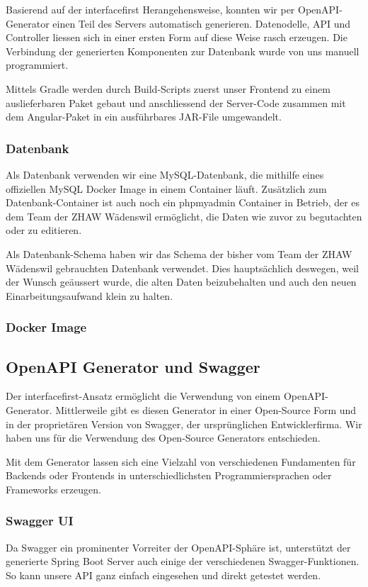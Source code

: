 \documentclass[../main.tex]{subfiles}
\begin{document}
	\noindent Basierend auf der \gls{interfacefirst} Herangehensweise, konnten wir per OpenAPI-Generator einen Teil des Servers automatisch generieren. Datenodelle, API und Controller liessen sich in einer ersten Form auf diese Weise rasch erzeugen. Die Verbindung der generierten Komponenten zur Datenbank wurde von uns manuell programmiert.
	
	\noindent Mittels Gradle werden durch Build-Scripts zuerst unser Frontend zu einem auslieferbaren Paket gebaut und anschliessend der Server-Code zusammen mit dem Angular-Paket in ein ausführbares JAR-File umgewandelt.
	
	\subsubsection{Datenbank}
	Als Datenbank verwenden wir eine MySQL-Datenbank, die mithilfe eines offiziellen MySQL Docker Image in einem Container läuft. Zusätzlich zum Datenbank-Container ist auch noch ein \gls{phpmyadmin} Container in Betrieb, der es dem Team der ZHAW Wädenswil ermöglicht, die Daten wie zuvor zu begutachten oder zu editieren.
	
	\noindent Als Datenbank-Schema haben wir das Schema der bisher vom Team der ZHAW Wädenswil gebrauchten Datenbank verwendet. Dies hauptsächlich deswegen, weil der Wunsch geäussert wurde, die alten Daten beizubehalten und auch den neuen Einarbeitungsaufwand klein zu halten.
	
	\subsubsection{Docker Image}
	
	
	\subsection{OpenAPI Generator und Swagger}
	Der \gls{interfacefirst}-Ansatz ermöglicht die Verwendung von einem OpenAPI-Generator. Mittlerweile gibt es diesen Generator in einer Open-Source Form und in der proprietären Version von Swagger, der ursprünglichen Entwicklerfirma. Wir haben uns für die Verwendung des Open-Source Generators entschieden.
	
	\noindent Mit dem Generator lassen sich eine Vielzahl von verschiedenen Fundamenten für Backends oder Frontends in unterschiedlichsten Programmiersprachen oder Frameworks erzeugen.
	
	\subsubsection{Swagger UI}
	Da Swagger ein prominenter Vorreiter der OpenAPI-Sphäre ist, unterstützt der generierte Spring Boot Server auch einige der verschiedenen Swagger-Funktionen. So kann unsere API ganz einfach eingesehen und direkt getestet werden.
	
\end{document}

